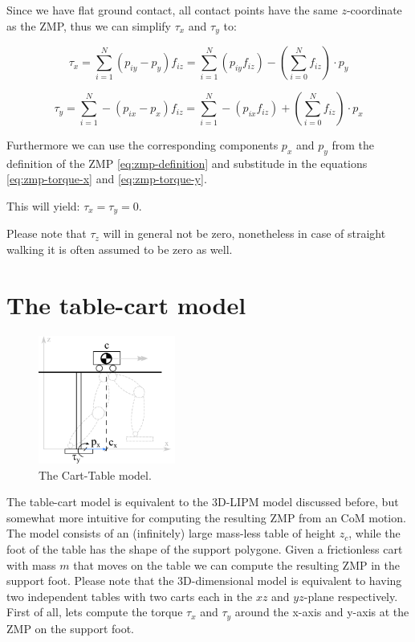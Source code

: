 \documentclass[english,ngerman]{KITreprt}
\begin{document}
Since we have flat ground contact, all contact points have the same
$z$-coordinate as the ZMP, thus we can simplify $\tau_x$ and $\tau_y$
to:

\begin{equation} \label{eq:zmp-torque-x}
\tau_x = \sum^N_{i=1} (p_{iy} - p_y) f_{iz} = \sum^N_{i=1} (p_{iy} f_{iz}) - (\sum^N_{i=0} f_{iz}) \cdot p_y
\end{equation}

\begin{equation}\label{eq:zmp-torque-y}
\tau_y = \sum^N_{i=1} - (p_{ix} - p_x) f_{iz} = \sum^N_{i=1} - (p_{ix} f_{iz}) + (\sum^N_{i=0} f_{iz}) \cdot p_x
\end{equation}

Furthermore we can use the corresponding components $p_x$ and $p_y$ from
the definition of the ZMP \ref{eq:zmp-definition} and substitude in the
equations \ref{eq:zmp-torque-x} and \ref{eq:zmp-torque-y}.

This will yield: $\tau_x = \tau_y = 0$.

Please note that $\tau_z$ will in general not be zero, nonetheless in
case of straight walking it is often assumed to be zero as well.

\section{The table-cart model}\label{section:table-cart}

\begin{figure}
  \begin{center}
     \includegraphics[width=0.4\textwidth]{images/carttable.png}
  \end{center}
  \caption{The Cart-Table model.}
\end{figure}

The table-cart model is equivalent to the 3D-LIPM model discussed
before, but somewhat more intuitive for computing the resulting ZMP from
an CoM motion. The model consists of an (infinitely) large mass-less
table of height $z_c$, while the foot of the table has the shape of the
support polygone. Given a frictionless cart with mass $m$ that moves on
the table we can compute the resulting ZMP in the support foot. Please
note that the 3D-dimensional model is equivalent to having two
independent tables with two carts each in the $xz$ and $yz$-plane
respectively. First of all, lets compute the torque $\tau_x$ and
$\tau_y$ around the x-axis and y-axis at the ZMP on the support foot.
\end{document}
